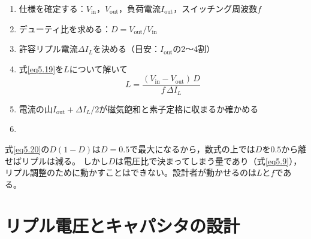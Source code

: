 \begin{screen}
\begin{enumerate}
\item 仕様を確定する：$V_{\mathrm{in}}$，$V_{\mathrm{out}}$，負荷電流$I_{\mathrm{out}}$，スイッチング周波数$f$
\item デューティ比を求める：$D = V_{\mathrm{out}}/V_{\mathrm{in}}$
\item 許容リプル電流$\mathit{\Delta}I_L$を決める（目安：$I_{\mathrm{out}}$の2〜4割）
\item 式\ref{eq5.19}を$L$について解いて
\begin{equation}
L = \frac{(V_{\mathrm{in}} - V_{\mathrm{out}})\, D}{f\, \mathit{\Delta}I_L}
\label{eq5.21}
\end{equation}
\item 電流の山$I_{\mathrm{out}} + \mathit{\Delta}I_L/2$が磁気飽和と素子定格に収まるか確かめる
\item {}
\end{enumerate}
\end{screen}


\begin{注意}
式\ref{eq5.20}の$D(1-D)$は$D = 0.5$で最大になるから，数式の上では$D$を$0.5$から離せばリプルは減る。
しかし$D$は電圧比で決まってしまう量であり（式\ref{eq5.9}），リプル調整のために動かすことはできない。設計者が動かせるのは$L$と$f$である。
\end{注意}



\section{リプル電圧とキャパシタの設計}
\label{sec5.6}

